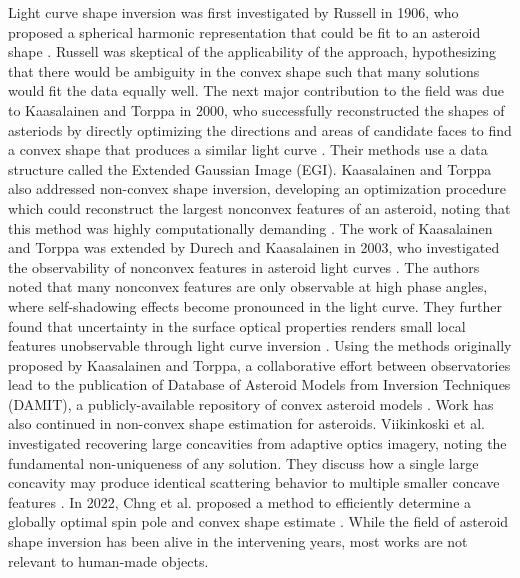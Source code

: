 Light curve shape inversion was first investigated by Russell in 1906, who proposed a spherical harmonic representation that could be fit to an asteroid shape \cite{russell1906}. Russell was skeptical of the applicability of the approach, hypothesizing that there would be ambiguity in the convex shape such that many solutions would fit the data equally well. The next major contribution to the field was due to Kaasalainen and Torppa in 2000, who successfully reconstructed the shapes of asteriods by directly optimizing the directions and areas of candidate faces to find a convex shape that produces a similar light curve \cite{kaasalainen2000, kaasalainen2001}. Their methods use a data structure called the Extended Gaussian Image (EGI). Kaasalainen and Torppa also addressed non-convex shape inversion, developing an optimization procedure which could reconstruct the largest nonconvex features of an asteroid, noting that this method was highly computationally demanding \cite{kaasalainen2000}. The work of Kaasalainen and Torppa was extended by Durech and Kaasalainen in 2003, who investigated the observability of nonconvex features in asteroid light curves \cite{durech2003}. The authors noted that many nonconvex features are only observable at high phase angles, where self-shadowing effects become pronounced in the light curve. They further found that uncertainty in the surface optical properties renders small local features unobservable through light curve inversion \cite{durech2003}. Using the methods originally proposed by Kaasalainen and Torppa, a collaborative effort between observatories lead to the publication of Database of Asteroid Models from Inversion Techniques (DAMIT), a publicly-available repository of convex asteroid models \cite{damit2014}. Work has also continued in non-convex shape estimation for asteroids. Viikinkoski et al. \cite{viikinkoski2017} investigated recovering large concavities from adaptive optics imagery, noting the fundamental non-uniqueness of any solution. They discuss how a single large concavity may produce identical scattering behavior to multiple smaller concave features \cite{viikinkoski2017}. In 2022, Chng et al. proposed a method to efficiently determine a globally optimal spin pole and convex shape estimate \cite{chng2022}. While the field of asteroid shape inversion has been alive in the intervening years, most works are not relevant to human-made objects.

